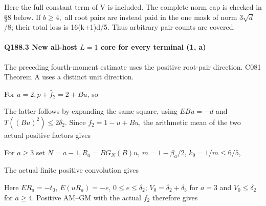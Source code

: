 

Here the full constant term of V is included. The complete norm cap is checked in §8 below. If \(b\ge 4,\allowbreak \allowbreak  \) all root pairs are instead paid in the one mask of norm 3\(\sqrt{d}\)/8; their total loss is 16(k+1)d/5. Thus arbitrary pair counts are covered.

\paragraph{Q188.3 New all-host \(L=1\) core for every terminal (1, a)}

The preceding fourth-moment estimate uses the positive root-pair direction.
C081 Theorem A uses a distinct unit direction.

For \(a=2,\allowbreak \allowbreak   p+\bar f_2=2+Bu\), so



The latter follows by expanding the same square, using \(E Bu=-d\) and \(T((Bu)^2)\le 2\delta_2\). Since \(f_2=1-u+Bu\), the arithmetic mean of the two actual positive factors gives



For \(a\ge 3\) set \(N=a-1,\allowbreak \allowbreak   R_a=B G_N(B)u\), \(m=1-\beta_a/2\), \(k_{0}=1/m\le 6/5\),



The actual finite positive convolution gives



Here \(ER_a=-t_{0}\), \(E(uR_a)=-e\), \(0\le e\le \delta_2\); \(V_{0}=\delta_2+\delta_3\) for \(a=3\) and \(V_{0}\le \delta_2\) for \(a\ge 4.\) Positive AM–GM with the actual \(f_2\) therefore gives

